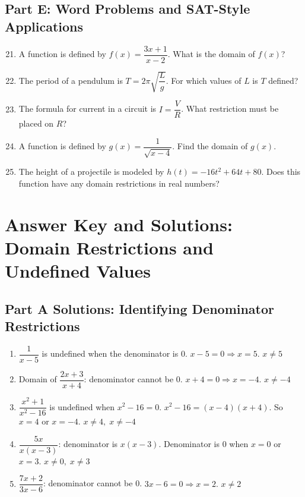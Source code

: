 \documentclass[12pt]{article}
\begin{document}
\subsection*{Part E: Word Problems and SAT-Style Applications}
\begin{enumerate}
  \setcounter{enumi}{20}
  \item A function is defined by \(f(x) = \dfrac{3x + 1}{x - 2}\). What is the domain of \(f(x)\)?
  \item The period of a pendulum is \(T = 2\pi \sqrt{\dfrac{L}{g}}\). For which values of \(L\) is \(T\) defined?
  \item The formula for current in a circuit is \(I = \dfrac{V}{R}\). What restriction must be placed on \(R\)?
  \item A function is defined by \(g(x) = \dfrac{1}{\sqrt{x - 4}}\). Find the domain of \(g(x)\).
  \item The height of a projectile is modeled by \(h(t) = -16t^2 + 64t + 80\). Does this function have any domain restrictions in real numbers?
\end{enumerate}

\newpage


\section*{Answer Key and Solutions: Domain Restrictions and Undefined Values}

\subsection*{Part A Solutions: Identifying Denominator Restrictions}
\begin{enumerate}
  \item \(\dfrac{1}{x - 5}\) is undefined when the denominator is 0.  
  \(x - 5 = 0 \Rightarrow x = 5.\)  
  \(\boxed{x \ne 5}\)

  \item Domain of \(\dfrac{2x + 3}{x + 4}\): denominator cannot be 0.  
  \(x + 4 = 0 \Rightarrow x = -4.\)  
  \(\boxed{x \ne -4}\)

  \item \(\dfrac{x^2 + 1}{x^2 - 16}\) is undefined when \(x^2 - 16 = 0\).  
  \(x^2 - 16 = (x - 4)(x + 4).\)  
  So \(x = 4\) or \(x = -4.\)  
  \(\boxed{x \ne 4,\; x \ne -4}\)

  \item \(\dfrac{5x}{x(x - 3)}\): denominator is \(x(x-3)\).  
  Denominator is 0 when \(x = 0\) or \(x = 3.\)  
  \(\boxed{x \ne 0,\; x \ne 3}\)

  \item \(\dfrac{7x + 2}{3x - 6}\): denominator cannot be 0.  
  \(3x - 6 = 0 \Rightarrow x = 2.\)  
  \(\boxed{x \ne 2}\)
\end{enumerate}
\end{document}
